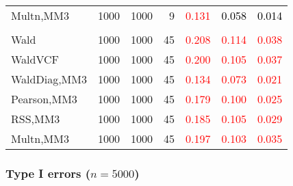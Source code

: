 \documentclass[
]{article}
\begin{document}
\begin{table}[H]
{\begin{tabular}[t]{lrrrrrr}
\hspace{1em}Multn,MM3 & 1000 & 1000 & 9 & \textcolor{red}{0.131} & \textcolor{black}{0.058} & \textcolor{black}{0.014}\\
\addlinespace[0.3em]
\multicolumn{7}{l}{\textbf{3F 15V}}\\
\hspace{1em}Wald & 1000 & 1000 & 45 & \textcolor{red}{0.208} & \textcolor{red}{0.114} & \textcolor{red}{0.038}\\
\hspace{1em}WaldVCF & 1000 & 1000 & 45 & \textcolor{red}{0.200} & \textcolor{red}{0.105} & \textcolor{red}{0.037}\\
\hspace{1em}WaldDiag,MM3 & 1000 & 1000 & 45 & \textcolor{red}{0.134} & \textcolor{red}{0.073} & \textcolor{red}{0.021}\\
\hspace{1em}Pearson,MM3 & 1000 & 1000 & 45 & \textcolor{red}{0.179} & \textcolor{red}{0.100} & \textcolor{red}{0.025}\\
\hspace{1em}RSS,MM3 & 1000 & 1000 & 45 & \textcolor{red}{0.185} & \textcolor{red}{0.105} & \textcolor{red}{0.029}\\
\hspace{1em}Multn,MM3 & 1000 & 1000 & 45 & \textcolor{red}{0.197} & \textcolor{red}{0.103} & \textcolor{red}{0.035}\\
\bottomrule
\end{tabular}}
\endgroup{}
\end{table}

\hypertarget{type-i-errors-n5000-3}{%
\subsubsection{\texorpdfstring{Type I errors
(\(n=5000\))}{Type I errors (n=5000)}}\label{type-i-errors-n5000-3}}
\end{document}
